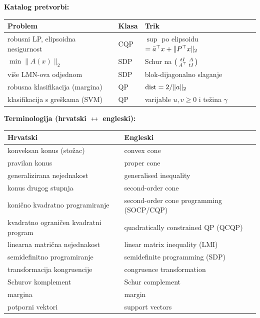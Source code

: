 \textbf{Katalog pretvorbi:}

\begin{center}
\begin{tabular}{P{6.2cm}P{2.0cm}P{4.6cm}}
\toprule
\textbf{Problem} & \textbf{Klasa} & \textbf{Trik} \\
\midrule
robusni LP, elipsoidna nesigurnost & CQP
  & $\sup$ po elipsoidu $= \bar a^{\top} x + \|P^{\top} x\|_2$ \\
$\min\|A(x)\|_2$ & SDP & Schur na $\begin{psmallmatrix}tI & A\\ A^{\top} & tI
  \end{psmallmatrix}$ \\
više LMN-ova odjednom & SDP & blok-dijagonalno slaganje \\
robusna klasifikacija (margina) & QP & $\operatorname{dist} = 2/\|a\|_2$ \\
klasifikacija s greškama (SVM) & QP & varijable $u, v \ge 0$ i težina $\gamma$ \\
\bottomrule
\end{tabular}
\end{center}

\textbf{Terminologija (hrvatski $\leftrightarrow$ engleski):}

\begin{center}
\begin{tabular}{ll}
\toprule
\textbf{Hrvatski} & \textbf{Engleski} \\
\midrule
konveksan konus (stožac) & convex cone \\
pravilan konus & proper cone \\
generalizirana nejednakost & generalised inequality \\
konus drugog stupnja & second-order cone \\
konično kvadratno programiranje & second-order cone programming (SOCP/CQP) \\
kvadratno ograničen kvadratni program & quadratically constrained QP (QCQP) \\
linearna matrična nejednakost & linear matrix inequality (LMI) \\
semidefinitno programiranje & semidefinite programming (SDP) \\
transformacija kongruencije & congruence transformation \\
Schurov komplement & Schur complement \\
margina & margin \\
potporni vektori & support vectors \\
\bottomrule
\end{tabular}
\end{center}
